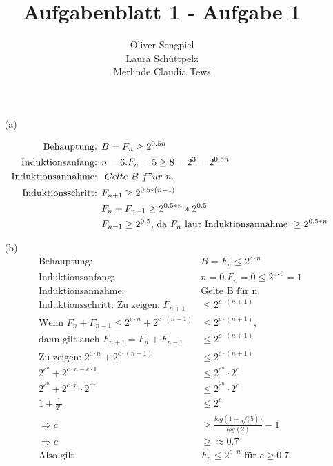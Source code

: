 \documentclass{article}
\title{Aufgabenblatt 1 - Aufgabe 1}
\author{Oliver Sengpiel \\
        Laura Schüttpelz \\
        Merlinde Claudia Tews}
\begin{document}
\maketitle


\begin{enumerate}
\item[(a)]

\begin{align*}
\text{Behauptung: }&B = F_n \ge 2^{0.5n} \\
\text{Induktionsanfang: } &n= 6. F_n = 5 \ge 8 = 2^3 = 2^{0.5n} \\
\text{Induktionsannahme: } &~Gelte~ B~ f"ur~ n. \\
\text{Induktionsschritt: } &F_{n+1} \ge 2^{0.5*(n+1)} \\
&F_n + F_{n-1} \ge 2^{0.5*n} * 2^{0.5} \\
&F_{n-1} \ge 2^{0.5} \text{, da } F_n \text{ laut Induktionsannahme } \ge 2^{0.5*n}
\end{align*}
	

\item[(b)]
\begin{align*}
\text{Behauptung: } &B = F_n \le 2^{c \cdot n} \\
\text{Induktionsanfang: } & n = 0. F_n = 0 \le 2^{c \cdot 0} = 1 \\
\text{Induktionsannahme: } &\text{Gelte B für n. } \\
\text{Induktionsschritt: Zu zeigen: } F_{n+1} &\le 2^{c \cdot (n+1)} \\
\text{Wenn } F_n + F_{n-1} \le 2^{c \cdot n} + 2^{c \cdot (n-1)} &\le 2^{c \cdot (n+1)}, \\
\text{dann gilt auch } F_{n+1} = F_n + F_{n-1} &\le 2^{c \cdot (n+1)} \\
\text{Zu zeigen: }  2^{c \cdot n} + 2^{c \cdot (n-1)} &\le 2^{c \cdot (n+1)} \\
2^{c^n} + 2^{c \cdot n - c \cdot 1} &\le 2^{c^n} \cdot 2^c \\
2^{c^n} + 2^{c \cdot n} \cdot 2^{c^{-1}} &\le 2^{c^n} \cdot 2^c \\
1 + \frac{1}{2^c} &\le 2^c \\
\Rightarrow c &\ge \frac{log(1+\sqrt(5))}{log(2)} -1 \\
\Rightarrow c &\ge \approx 0.7 \\
\text{Also gilt } &F_n \le 2^{c \cdot n} \text{ für } c \ge 0.7.
\end{align*}
\end{enumerate}
\end{document}
